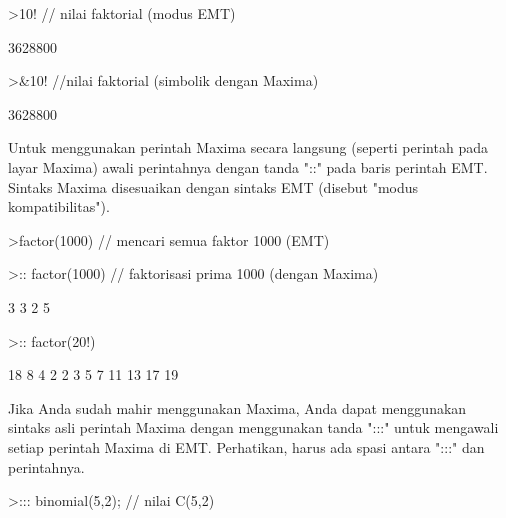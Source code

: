 \documentclass[a4paper,10pt]{article}
\begin{document}
\begin{eulernotebook}
\begin{eulercomment}
\begin{eulercomment}
\begin{eulercomment}
\begin{eulercomment}
\begin{euleroutput}
\end{euleroutput}
\begin{eulerprompt}
>10! // nilai faktorial (modus EMT)
\end{eulerprompt}
\begin{euleroutput}
  3628800
\end{euleroutput}
\begin{eulerprompt}
>&10! //nilai faktorial (simbolik dengan Maxima)
\end{eulerprompt}
\begin{euleroutput}
  
                                       3628800
  
\end{euleroutput}
\begin{eulercomment}
Untuk menggunakan perintah Maxima secara langsung (seperti perintah pada layar
Maxima) awali perintahnya dengan tanda "::" pada baris perintah EMT. Sintaks
Maxima disesuaikan dengan sintaks EMT (disebut "modus kompatibilitas").
\end{eulercomment}
\begin{eulerprompt}
>factor(1000) // mencari semua faktor 1000 (EMT)
\end{eulerprompt}
\begin{euleroutput}
  [2,  2,  2,  5,  5,  5]
\end{euleroutput}
\begin{eulerprompt}
>:: factor(1000) // faktorisasi prima 1000 (dengan Maxima) 
\end{eulerprompt}
\begin{euleroutput}
  
                                         3  3
                                        2  5
  
\end{euleroutput}
\begin{eulerprompt}
>:: factor(20!)
\end{eulerprompt}
\begin{euleroutput}
  
                               18  8  4  2
                              2   3  5  7  11 13 17 19
  
\end{euleroutput}
\begin{eulercomment}
Jika Anda sudah mahir menggunakan Maxima, Anda dapat menggunakan sintaks asli
perintah Maxima dengan menggunakan tanda ":::" untuk mengawali setiap perintah
Maxima di EMT. Perhatikan, harus ada spasi antara ":::" dan perintahnya.
\end{eulercomment}
\begin{eulerprompt}
>::: binomial(5,2); // nilai C(5,2)
\end{eulerprompt}
\begin{euleroutput}
  

\end{euleroutput}
\end{eulercomment}
\end{eulercomment}
\end{eulercomment}
\end{eulercomment}
\end{eulernotebook}
\end{document}
